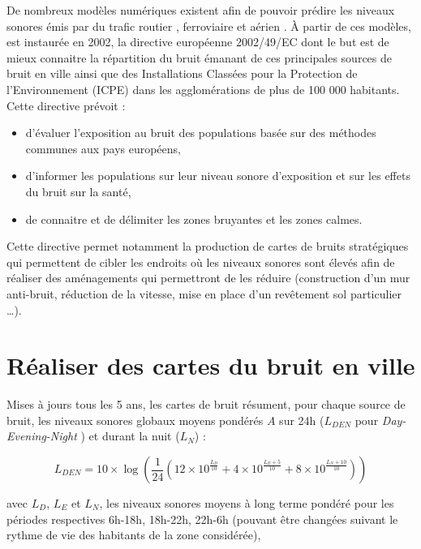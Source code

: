 De nombreux modèles numériques existent afin de pouvoir prédire les niveaux sonores émis par du trafic routier \cite{quartieri2009review}, ferroviaire \cite{van2000railway} et aérien \cite{zaporozhets1998aircraft}.
À partir de ces modèles, est instaurée en 2002, la directive européenne 2002/49/EC dont le but est de mieux connaitre la répartition du bruit émanant de ces principales sources de bruit en ville ainsi que des Installations Classées pour la Protection de l'Environnement (ICPE) dans les agglomérations de plus de 100 000 habitants. Cette directive prévoit :

\begin{itemize}
	\item d'évaluer l'exposition au bruit des populations basée sur des méthodes communes aux pays européens,
	\item d'informer les populations sur leur niveau sonore d'exposition et sur les effets du bruit sur la santé,
	\item de connaitre et de délimiter les zones bruyantes et les zones calmes.\\
\end{itemize}

Cette directive permet notamment la production de cartes de bruits stratégiques qui permettent de cibler les endroits où les niveaux sonores sont élevés afin de réaliser des aménagements qui permettront de les réduire (construction d'un mur anti-bruit, réduction de la vitesse, mise en place d'un revêtement sol particulier \dots).


\section{Réaliser des cartes du bruit en ville}
Mises à jours tous les 5 ans, les cartes de bruit résument, pour chaque source de bruit, les niveaux sonores globaux moyens pondérés $A$ sur 24h ($L_{DEN}$ pour \textit{Day-Evening-Night} ) et durant la nuit ($L_N$) :

\begin{equation}
L_{DEN} = 10\times\log \left(\frac{1}{24} \left(12\times10^{\frac{L_D}{10}}+4\times10^{\frac{L_E+5}{10}}+8\times10^{\frac{L_N+10}{10}} \right)\right)
\end{equation}

avec $L_D$, $L_E$ et $L_N$, les niveaux sonores moyens à long terme pondéré  pour les périodes respectives 6h-18h, 18h-22h, 22h-6h (pouvant être changées suivant le rythme de vie des habitants de la zone considérée),

